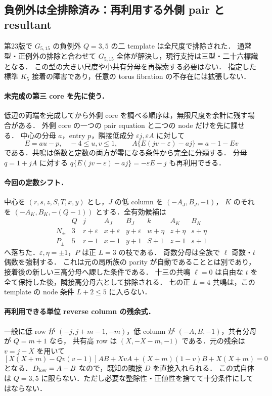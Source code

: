 \subsection{負例外は全排除済み：再利用する外側 pair と resultant}
\label{notes:negative-exception-v23}

第23版で $G_{5,15}$ の負例外 $Q=3,5$ の二 template は全尺度で排除された．
通常型・正例外の排除と合わせて $G_{5,15}$ 全体が解決し，現行支持は三型・二十六標識となる．
この型の大きい尺度や小共有分母を再探索する必要はない．
指定した標準 $K_5$ 接着の障害であり，任意の torus fibration の不存在には拡張しない．

\paragraph{未完成の第三 core を先に使う．}
低辺の両端を完成してから外側 core を調べる順序は，無限尺度を余計に残す場合がある．
外側 core の一つの pair equation と二つの node だけを先に課せる．
中心の分母 $a$，entry $p$，隣接低成分 $\varepsilon j,\varepsilon A$ に対して
\[
 E=au-p,\quad -4\le u,v\le1,\qquad
 A\{E(jv-\varepsilon)-aj\}=a-1-Ev
\]
である．共鳴は係数と定数の両方が零になる条件から完全に分類する．
分母 $q=1+jA$ に対する $q\{E(jv-\varepsilon)-aj\}=-\varepsilon E-j$ も再利用できる．

\paragraph{今回の定数シフト．}
中心を $(r,s,z,S,T,x,y)$ とし，$J$ の低 column を $(-A_J,B_J,-1)$，
$K$ のそれを $(-A_K,B_K,-(Q-1))$ とする．全有効候補は
\[
\begin{array}{c|c|ccc|ccc}
&Q&j&A_J&B_J&k&A_K&B_K\\\hline
N_\pm&3&r+\varepsilon&x+\varepsilon&y+\varepsilon&w+\eta&z+\eta&s+\eta\\
P_\pm&5&r-1&x-1&y+1&S+1&z-1&s+1
\end{array}
\]
へ落ちた．$\varepsilon,\eta=\pm1$，$P$ は正 $L=3$ の枝である．
奇数分母は全族で $\ell$ 奇数・$t$ 偶数を強制する．
これは元の局所族の parity が自動であることとは別であり，接着後の新しい三高分母へ課した条件である．
十三の共鳴 $\ell=0$ は自由な $t$ を全て保持した後，隣接高分母六として排除される．
七の正 $L=4$ 共鳴は，この template の node 条件 $L+2\le5$ に入らない．

\paragraph{再利用できる単位 reverse column の残余式．}
一般に低 row が $(-j,j+m-1,-m)$，低 column が $(-A,B,-1)$，共有分母が $Q=m+1$ なら，
共有高 row は $(X,-X-m,-1)$ である．元の残余は $v=j-X$ を用いて
\[
 [X(X+m)-Qv(v-1)]AB+XvA+(X+m)(1-v)B+X(X+m)=0
\]
となる．$D_{\rm low}=A-B$ なので，既知の隣接 $D$ を直接入れられる．
この式自体は $Q=3,5$ に限らない．ただし必要な整除性・正値性を捨てて十分条件にしてはならない．

